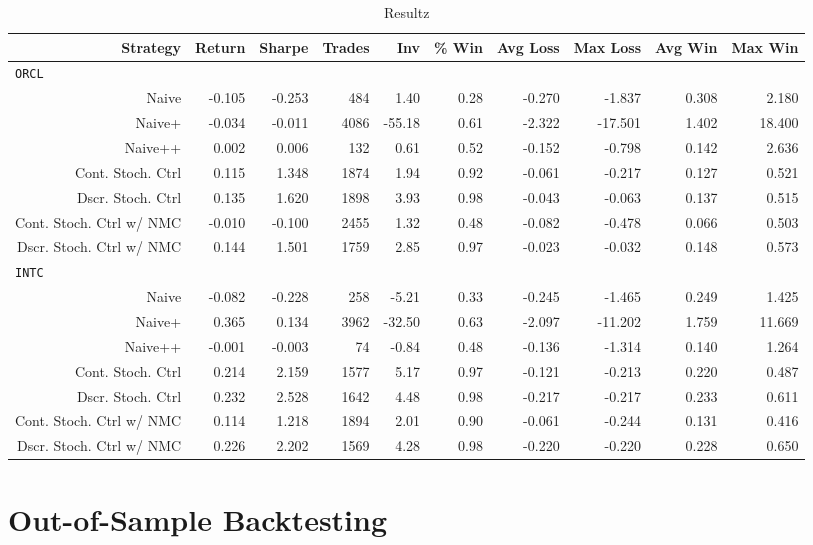 \begin{sidewaystable}
\centering
{}
\begin{tabular}{@{} *{10}{r} @{}}
\toprule
Strategy & Return & Sharpe & Trades & Inv & \% Win & Avg Loss & Max Loss & Avg Win & Max Win \\
\midrule
\multicolumn{10}{l}{\texttt{ORCL}} \\
Naive & -0.105 & -0.253 & 484 & 1.40 & 0.28 & -0.270 & -1.837 & 0.308 & 2.180 \\ 
Naive+ & -0.034 & -0.011 & 4086 & -55.18 & 0.61 & -2.322 & -17.501 & 1.402 & 18.400 \\ 
Naive++ & 0.002 & 0.006 & 132 & 0.61 & 0.52 & -0.152 & -0.798 & 0.142 & 2.636 \\ 
Cont. Stoch. Ctrl & 0.115 & 1.348 & 1874 & 1.94 & 0.92 & -0.061 & -0.217 & 0.127 & 0.521 \\ 
Dscr. Stoch. Ctrl & 0.135 & 1.620 & 1898 & 3.93 & 0.98 & -0.043 & -0.063 & 0.137 & 0.515 \\ 
Cont. Stoch. Ctrl w/ NMC & -0.010 & -0.100 & 2455 & 1.32 & 0.48 & -0.082 & -0.478 & 0.066 & 0.503 \\ 
Dscr. Stoch. Ctrl w/ NMC & 0.144 & 1.501 & 1759 & 2.85 & 0.97 & -0.023 & -0.032 & 0.148 & 0.573 \\[2ex]
\multicolumn{10}{l}{\texttt{INTC}} \\
Naive & -0.082 & -0.228 & 258 & -5.21 & 0.33 & -0.245 & -1.465 & 0.249 & 1.425 \\ 
Naive+ & 0.365 & 0.134 & 3962 & -32.50 & 0.63 & -2.097 & -11.202 & 1.759 & 11.669 \\ 
Naive++ & -0.001 & -0.003 & 74 & -0.84 & 0.48 & -0.136 & -1.314 & 0.140 & 1.264 \\ 
Cont. Stoch. Ctrl & 0.214 & 2.159 & 1577 & 5.17 & 0.97 & -0.121 & -0.213 & 0.220 & 0.487 \\ 
Dscr. Stoch. Ctrl & 0.232 & 2.528 & 1642 & 4.48 & 0.98 & -0.217 & -0.217 & 0.233 & 0.611 \\ 
Cont. Stoch. Ctrl w/ NMC & 0.114 & 1.218 & 1894 & 2.01 & 0.90 & -0.061 & -0.244 & 0.131 & 0.416 \\ 
Dscr. Stoch. Ctrl w/ NMC &  0.226 & 2.202 & 1569 & 4.28 & 0.98 & -0.220 & -0.220 & 0.228 & 0.650 \\ 
\bottomrule
\end{tabular}
\caption{Resultz}
\label{tbl:insampleORCLINTC}
\end{sidewaystable}




\section{Out-of-Sample Backtesting}
